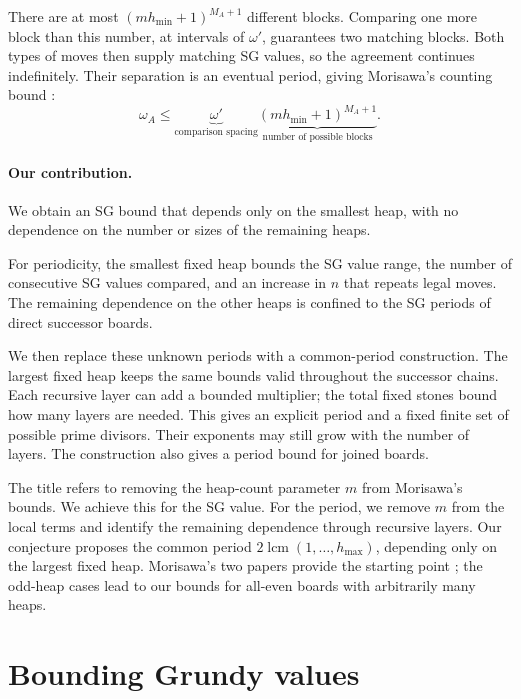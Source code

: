 \documentclass[10pt,a4paper]{article}
\begin{document}
There are at most $(mh_{\min}+1)^{M_A+1}$ different blocks.
Comparing one more block than this number, at intervals of
$\omega'$, guarantees two matching blocks. Both types of moves
then supply matching SG values, so the agreement continues
indefinitely. Their separation is an eventual period, giving
Morisawa's counting bound
\cite[Section 8]{Morisawa2026}:
\begin{equation}
 \boxed{
 \omega_A\le
 \underbrace{\omega'}_{\text{comparison spacing}}
 \underbrace{(mh_{\min}+1)^{M_A+1}}_{\text{number of possible blocks}}.
 }
 \label{eq:oldperiodbound}
\end{equation}

\paragraph{Our contribution.}
We obtain an SG bound that depends only on the smallest heap,
with no dependence on the number or sizes of the remaining heaps.

For periodicity, the smallest fixed heap bounds the SG value
range, the number of consecutive SG values compared, and
an increase in $n$ that repeats legal moves. The remaining
dependence on the other heaps is confined to the SG periods
of direct successor boards.

We then replace these unknown periods with a common-period construction.
The largest fixed heap keeps the same bounds valid throughout the
successor chains. Each recursive layer can add a bounded multiplier;
the total fixed stones bound how many layers are needed. This gives
an explicit period and a fixed finite set of possible prime divisors.
Their exponents may still grow with the number of layers.
The construction also gives a period bound for joined boards.

The title refers to removing the heap-count parameter $m$ from
Morisawa's bounds. We achieve this for the SG value. For the period,
we remove $m$ from the local terms and identify the remaining
dependence through recursive layers. Our conjecture proposes the
common period $2\operatorname{lcm}(1,\ldots,h_{\max})$, depending
only on the largest fixed heap.
Morisawa's two papers provide the starting point
\cite{Morisawa2025,Morisawa2026}; the odd-heap cases lead to our
bounds for all-even boards with arbitrarily many heaps.


\section{Bounding Grundy values}
\label{sec:values}
\end{document}
